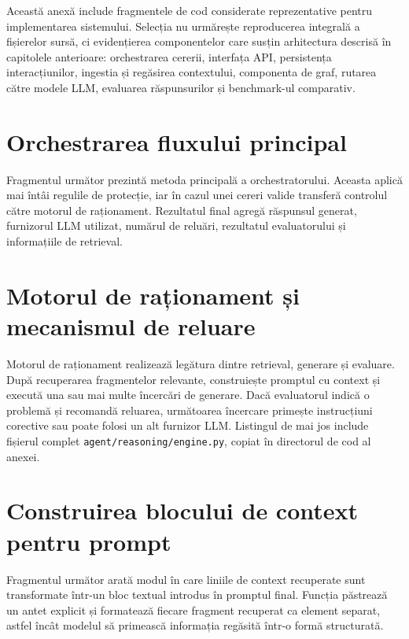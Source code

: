\documentclass[12pt, a4paper, oneside, romanian]{teza-upb}
\begin{document}
Această anexă include fragmentele de cod considerate reprezentative pentru implementarea sistemului. Selecția nu urmărește reproducerea integrală a fișierelor sursă, ci evidențierea componentelor care susțin arhitectura descrisă în capitolele anterioare: orchestrarea cererii, interfața API, persistența interacțiunilor, ingestia și regăsirea contextului, componenta de graf, rutarea către modele LLM, evaluarea răspunsurilor și benchmark-ul comparativ.

\section{Orchestrarea fluxului principal}

Fragmentul următor prezintă metoda principală a orchestratorului. Aceasta aplică mai întâi regulile de protecție, iar în cazul unei cereri valide transferă controlul către motorul de raționament. Rezultatul final agregă răspunsul generat, furnizorul LLM utilizat, numărul de reluări, rezultatul evaluatorului și informațiile de retrieval.

\label{anexa:orchestrator-flow}


\section{Motorul de raționament și mecanismul de reluare}

Motorul de raționament realizează legătura dintre retrieval, generare și evaluare. După recuperarea fragmentelor relevante, construiește promptul cu context și execută una sau mai multe încercări de generare. Dacă evaluatorul indică o problemă și recomandă reluarea, următoarea încercare primește instrucțiuni corective sau poate folosi un alt furnizor LLM. Listingul de mai jos include fișierul complet \texttt{agent/reasoning/engine.py}, copiat în directorul de cod al anexei.

\label{anexa:reasoning-engine}


\section{Construirea blocului de context pentru prompt}

Fragmentul următor arată modul în care liniile de context recuperate sunt transformate într-un bloc textual introdus în promptul final. Funcția păstrează un antet explicit și formatează fiecare fragment recuperat ca element separat, astfel încât modelul să primească informația regăsită într-o formă structurată.
\end{document}
